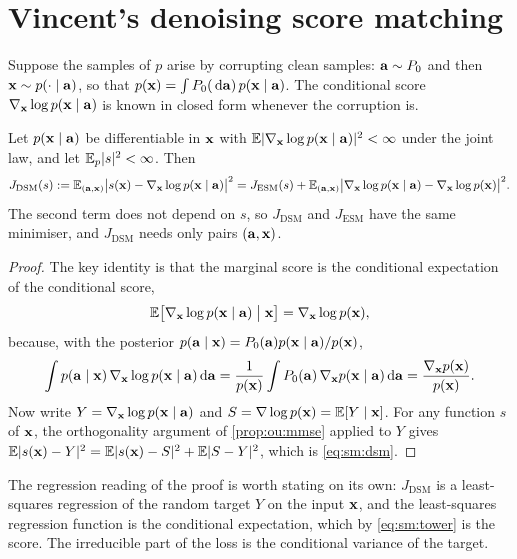\section{Vincent's denoising score matching}
\label{sec:sm:dsm}

Suppose the samples of $p$ arise by corrupting clean samples: $\mathbf{a}\sim P_0$ and then
$\mathbf{x}\sim p(\cdot\mid\mathbf{a})$, so that $p(\mathbf{x})=\int P_0(\,\mathrm{d}\mathbf{a})\,p(\mathbf{x}\mid\mathbf{a})$. The
conditional score $\nabla_{\mathbf{x}}\log p(\mathbf{x}\mid\mathbf{a})$ is known in closed form whenever the
corruption is.

\begin{theorem}
\label{thm:sm:dsm}
Let $p(\mathbf{x}\mid\mathbf{a})$ be differentiable in $\mathbf{x}$ with $\mathbb{E}|\nabla_{\mathbf{x}}\log p(\mathbf{x}\mid\mathbf{a})|^2<\infty$
under the joint law, and let $\mathbb{E}_p|s|^2<\infty$. Then
\begin{equation}
  J_{\mathrm{DSM}}(s):=\mathbb{E}_{(\mathbf{a},\mathbf{x})}\bigl|s(\mathbf{x})-\nabla_{\mathbf{x}}\log p(\mathbf{x}\mid\mathbf{a})\bigr|^2
  =J_{\mathrm{ESM}}(s)+\mathbb{E}_{(\mathbf{a},\mathbf{x})}\bigl|\nabla_{\mathbf{x}}\log p(\mathbf{x}\mid\mathbf{a})-\nabla_{\mathbf{x}}\log p(\mathbf{x})\bigr|^2 .
  \label{eq:sm:dsm}
\end{equation}
The second term does not depend on $s$, so $J_{\mathrm{DSM}}$ and $J_{\mathrm{ESM}}$
have the same minimiser, and $J_{\mathrm{DSM}}$ needs only pairs $(\mathbf{a},\mathbf{x})$.
\end{theorem}

\begin{proof}
The key identity is that the marginal score is the conditional expectation of the
conditional score,
\begin{equation}
  \mathbb{E}\bigl[\nabla_{\mathbf{x}}\log p(\mathbf{x}\mid\mathbf{a})\;\big|\;\mathbf{x}\bigr]=\nabla_{\mathbf{x}}\log p(\mathbf{x}),
  \label{eq:sm:tower}
\end{equation}
because, with the posterior $p(\mathbf{a}\mid\mathbf{x})=P_0(\mathbf{a})p(\mathbf{x}\mid\mathbf{a})/p(\mathbf{x})$,
\[
  \int p(\mathbf{a}\mid\mathbf{x})\,\nabla_{\mathbf{x}}\log p(\mathbf{x}\mid\mathbf{a})\,\mathrm{d}\mathbf{a}
  =\frac{1}{p(\mathbf{x})}\int P_0(\mathbf{a})\,\nabla_{\mathbf{x}}p(\mathbf{x}\mid\mathbf{a})\,\mathrm{d}\mathbf{a}
  =\frac{\nabla_{\mathbf{x}}p(\mathbf{x})}{p(\mathbf{x})} .
\]
Now write $Y=\nabla_{\mathbf{x}}\log p(\mathbf{x}\mid\mathbf{a})$ and $S=\nabla\log p(\mathbf{x})=\mathbb{E}[Y\mid\mathbf{x}]$. For
any function $s$ of $\mathbf{x}$, the orthogonality argument of \cref{prop:ou:mmse} applied
to $Y$ gives $\mathbb{E}|s(\mathbf{x})-Y|^2=\mathbb{E}|s(\mathbf{x})-S|^2+\mathbb{E}|S-Y|^2$, which is \cref{eq:sm:dsm}.
\end{proof}

The regression reading of the proof is worth stating on its own: $J_{\mathrm{DSM}}$ is
a least-squares regression of the random target $Y$ on the input $\mathbf{x}$, and the
least-squares regression function is the conditional expectation, which by
\cref{eq:sm:tower} is the score. The irreducible part of the loss is the conditional
variance of the target.

